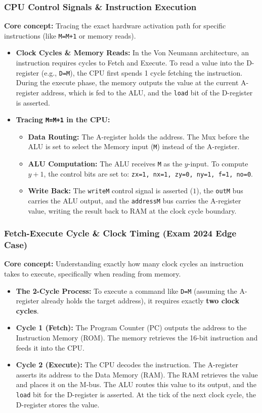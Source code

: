 \documentclass[12pt,a4paper]{article}
\begin{document}
\subsubsection*{CPU Control Signals \& Instruction Execution}
\textbf{Core concept:} Tracing the exact hardware activation path for specific instructions (like \texttt{M=M+1} or memory reads).
\begin{itemize}
    \item \textbf{Clock Cycles \& Memory Reads:} In the Von Neumann architecture, an instruction requires cycles to Fetch and Execute. To read a value into the D-register (e.g., \texttt{D=M}), the CPU first spends 1 cycle fetching the instruction. During the execute phase, the memory outputs the value at the current A-register address, which is fed to the ALU, and the \texttt{load} bit of the D-register is asserted.
    \item \textbf{Tracing \texttt{M=M+1} in the CPU:}
    \begin{itemize}
        \item \textbf{Data Routing:} The A-register holds the address. The Mux before the ALU is set to select the Memory input (\texttt{M}) instead of the A-register.
        \item \textbf{ALU Computation:} The ALU receives \texttt{M} as the $y$-input. To compute $y+1$, the control bits are set to: \texttt{zx=1, nx=1, zy=0, ny=1, f=1, no=0}.
        \item \textbf{Write Back:} The \texttt{writeM} control signal is asserted ($1$), the \texttt{outM} bus carries the ALU output, and the \texttt{addressM} bus carries the A-register value, writing the result back to RAM at the clock cycle boundary.
    \end{itemize}
\end{itemize}

\subsubsection*{Fetch-Execute Cycle \& Clock Timing (Exam 2024 Edge Case)}
\textbf{Core concept:} Understanding exactly how many clock cycles an instruction takes to execute, specifically when reading from memory.
\begin{itemize}
    \item \textbf{The 2-Cycle Process:} To execute a command like \texttt{D=M} (assuming the A-register already holds the target address), it requires exactly \textbf{two clock cycles}.
    \item \textbf{Cycle 1 (Fetch):} The Program Counter (PC) outputs the address to the Instruction Memory (ROM). The memory retrieves the 16-bit instruction and feeds it into the CPU.
    \item \textbf{Cycle 2 (Execute):} The CPU decodes the instruction. The A-register asserts its address to the Data Memory (RAM). The RAM retrieves the value and places it on the M-bus. The ALU routes this value to its output, and the \texttt{load} bit for the D-register is asserted. At the tick of the next clock cycle, the D-register stores the value.
\end{itemize}
\end{document}
